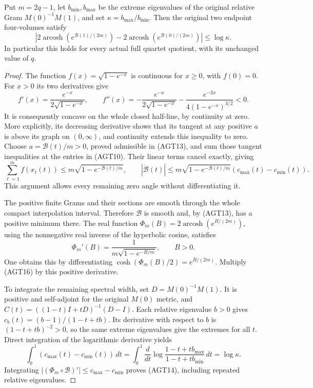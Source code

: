 \documentclass{article}
\begin{document}
\begin{theorem}
Put $m=2q-1$, let $b_{\min},b_{\max}$ be the extreme
eigenvalues of the original relative Gram
$M(0)^{-1}M(1)$, and set $\kappa=b_{\max}/b_{\min}$.
Then the original two endpoint four-volumes satisfy
\[
 \left|2\operatorname{arcosh}\!\left(e^{\mathcal B(1)/(2m)}\right)
       -2\operatorname{arcosh}\!\left(e^{\mathcal B(0)/(2m)}\right)
 \right|\le\log\kappa.
 \tag{AGT14}
\]
In particular this holds for every actual full quartet
quotient, with its unchanged value of $q$.
\end{theorem}
\begin{proof}
The function $f(x)=\sqrt{1-e^{-x}}$ is continuous for $x\ge0$,
with $f(0)=0$. For $x>0$ its two derivatives give
\[
 f'(x)=\frac{e^{-x}}{2\sqrt{1-e^{-x}}},\qquad
 f''(x)=-\frac{e^{-x}}{2\sqrt{1-e^{-x}}}
        -\frac{e^{-2x}}{4(1-e^{-x})^{3/2}}<0.
 \tag{AGT15}
\]
It is consequently concave on the whole closed half-line,
by continuity at zero. More explicitly, its decreasing
derivative shows that its tangent at any positive $a$ is
above its graph on $(0,\infty)$, and continuity extends
this inequality to zero. Choose
$a=\mathcal B(t)/m>0$, proved admissible in (AGT13), and
sum those tangent inequalities at the entries in (AGT10).
Their linear terms cancel exactly, giving
\[
 \sum_{\ell=1}^m f(x_\ell(t))
 \le m\sqrt{1-e^{-\mathcal B(t)/m}},\qquad
 |\dot{\mathcal B}(t)|
 \le m\sqrt{1-e^{-\mathcal B(t)/m}}
                 (c_{\max}(t)-c_{\min}(t)).
 \tag{AGT16}
\]
This argument allows every remaining zero angle without
differentiating it.

The positive finite Grams and their sections are smooth
through the whole compact interpolation interval. Therefore
$\mathcal B$ is smooth and, by (AGT13), has a positive
minimum there. The real function
$\Phi_m(B)=2\operatorname{arcosh}(e^{B/(2m)})$, using the
nonnegative real inverse of the hyperbolic cosine, satisfies
\[
 \Phi_m'(B)=\frac{1}{m\sqrt{1-e^{-B/m}}},\qquad B>0.
 \tag{AGT17}
\]
One obtains this by differentiating
$\cosh(\Phi_m(B)/2)=e^{B/(2m)}$. Multiply (AGT16) by
this positive derivative.

To integrate the remaining spectral width, set
$D=M(0)^{-1}M(1)$. It is positive and self-adjoint for the
original $M(0)$ metric, and
$C(t)=((1-t)I+tD)^{-1}(D-I)$. Each relative eigenvalue
$b>0$ gives $c_b(t)=(b-1)/(1-t+tb)$.
Its derivative with respect to $b$ is $(1-t+tb)^{-2}>0$,
so the same extreme eigenvalues give the extremes for all
$t$. Direct integration of the logarithmic derivative yields
\[
 \int_0^1(c_{\max}(t)-c_{\min}(t))\,dt
 =\int_0^1\frac{d}{dt}
      \log\frac{1-t+tb_{\max}}{1-t+tb_{\min}}\,dt
 =\log\kappa.
 \tag{AGT18}
\]
Integrating $|(\Phi_m\circ\mathcal B)'|\le c_{\max}-c_{\min}$
proves (AGT14), including repeated relative eigenvalues.
\end{proof}
\end{document}
